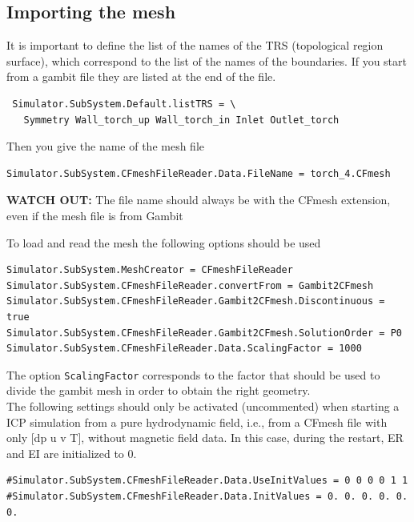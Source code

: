 \documentclass[11pt]{article}
\begin{document}
\subsection{Importing the mesh}
It is important to define the list of the names of the TRS (topological region surface), which
correspond to the list of the names of the boundaries. If you start from a gambit file they are listed at
the end of the file.
\begin{verbatim}
 Simulator.SubSystem.Default.listTRS = \
   Symmetry Wall_torch_up Wall_torch_in Inlet Outlet_torch 
\end{verbatim}
Then you give the name of the mesh file
\begin{verbatim}
Simulator.SubSystem.CFmeshFileReader.Data.FileName = torch_4.CFmesh
\end{verbatim}
{\bf WATCH OUT:} The file name should always be with the CFmesh extension, even 
if the mesh file is from Gambit

To load and read the mesh the following options should be used
\begin{verbatim}
Simulator.SubSystem.MeshCreator = CFmeshFileReader
Simulator.SubSystem.CFmeshFileReader.convertFrom = Gambit2CFmesh
Simulator.SubSystem.CFmeshFileReader.Gambit2CFmesh.Discontinuous = true
Simulator.SubSystem.CFmeshFileReader.Gambit2CFmesh.SolutionOrder = P0
Simulator.SubSystem.CFmeshFileReader.Data.ScalingFactor = 1000
\end{verbatim}
The option \texttt{ScalingFactor} corresponds to the factor that should be used
to divide the gambit mesh in order to obtain the right geometry.\\
The following settings should only be activated (uncommented) when starting a ICP simulation from a 
pure hydrodynamic field, i.e., from a CFmesh file with only [dp u v T], without 
magnetic field data. In this case, during the restart, ER and EI are initialized to 0.
 
\begin{verbatim}
#Simulator.SubSystem.CFmeshFileReader.Data.UseInitValues = 0 0 0 0 1 1 
#Simulator.SubSystem.CFmeshFileReader.Data.InitValues = 0. 0. 0. 0. 0. 0. 
\end{verbatim}
\end{document}
